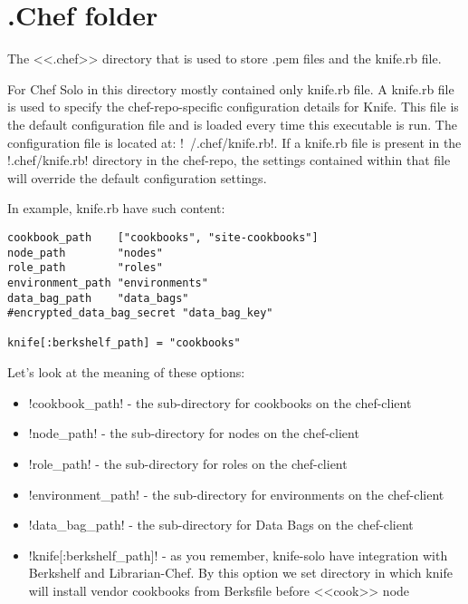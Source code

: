 \section{.Chef folder}
\label{sec:solo-chef-folder}

The <<.chef>> directory that is used to store .pem files and the knife.rb file.

For Chef Solo in this directory mostly contained only knife.rb file. A knife.rb file is used to specify the chef-repo-specific configuration details for Knife. This file is the default configuration file and is loaded every time this executable is run. The configuration file is located at: \inline!~/.chef/knife.rb!. If a knife.rb file is present in the \inline!.chef/knife.rb! directory in the chef-repo, the settings contained within that file will override the default configuration settings.

In example, knife.rb have such content:

\begin{lstlisting}[label=lst:my-cloud-chef-folder1,title=my-cloud/.chef/knife.rb]
cookbook_path    ["cookbooks", "site-cookbooks"]
node_path        "nodes"
role_path        "roles"
environment_path "environments"
data_bag_path    "data_bags"
#encrypted_data_bag_secret "data_bag_key"

knife[:berkshelf_path] = "cookbooks"
\end{lstlisting}

Let's look at the meaning of these options:

\begin{itemize}
  \item \inline!cookbook_path! - the sub-directory for cookbooks on the chef-client
  \item \inline!node_path! - the sub-directory for nodes on the chef-client
  \item \inline!role_path! - the sub-directory for roles on the chef-client
  \item \inline!environment_path! - the sub-directory for environments on the chef-client
  \item \inline!data_bag_path! - the sub-directory for Data Bags on the chef-client
  \item \inline!knife[:berkshelf_path]! - as you remember, knife-solo have integration with Berkshelf and Librarian-Chef. By this option we set directory in which knife will install vendor cookbooks from Berksfile before <<cook>> node
\end{itemize}
